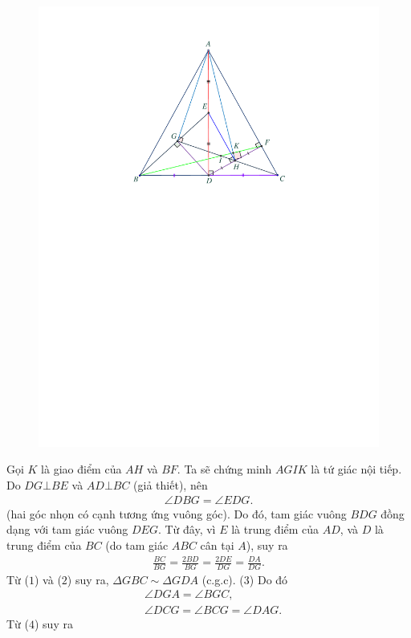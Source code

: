 \begin{multicols}{2}
\begin{figure}[H]
		\includegraphics[width= 0.85\linewidth]{P605}
		\vspace*{-15pt}
	\end{figure}
	Gọi $K$ là giao điểm của $AH$ và $BF$. Ta sẽ chứng minh $AGIK$ là tứ giác nội tiếp.
	\vskip 0.05cm
	Do $DG \bot BE$ và $AD \bot BC$ (giả thiết), nên
	\begin{align*}
		\angle DBG = \angle EDG.\tag{$1$}
	\end{align*}
	(hai góc nhọn có cạnh tương ứng vuông góc).
	\vskip 0.05cm
	Do đó, tam giác vuông $BDG$ đồng dạng với tam giác vuông $DEG$. Từ đây, vì $E$ là trung điểm của $AD$, và $D$ là trung điểm của $BC$ (do tam giác $ABC$ cân tại $A$), suy ra
	\begin{align*}
		\frac{{BC}}{{BG}} = \frac{{2BD}}{{BG}} = \frac{{2DE}}{{DG}} = \frac{{DA}}{{DG}}. \tag{$2$}
	\end{align*}
	Từ ($1$) và ($2$) suy ra, $\Delta GBC \sim \Delta GDA$ (c.g.c). \hfill($3$)
	\vskip 0.05cm
	Do đó
	\begin{align*}
		&\angle DGA = \angle BGC, \tag{$4$}\\
		&\angle DCG = \angle BCG = \angle DAG.\tag{$5$}
	\end{align*}
	Từ ($4$) suy ra
	\begin{align*}

\end{align*}
\end{multicols}
